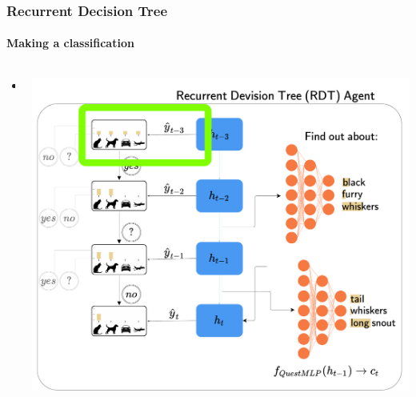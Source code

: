 \documentclass[9pt]{beamer}
\begin{document}
\begin{frame}
\frametitle{Recurrent Decision Tree}
\framesubtitle{Making a classification}
\begin{columns}[T]
	\begin{column}{.5\textwidth}
		\begin{itemize}
			\item 
		\end{itemize}
	\end{column}
	\begin{column}{.5\textwidth}
			\includegraphics[width=\textwidth]{images/urdtc_parts_classMLP.pdf}
	\end{column}
\end{columns}
\end{frame}

\end{document}
